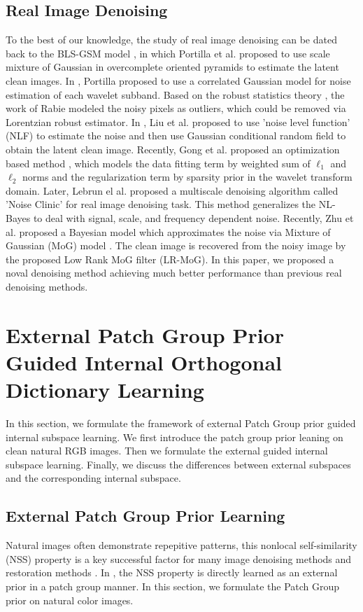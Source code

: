\documentclass[10pt,twocolumn,letterpaper]{article}
\begin{document}
\subsection{Real Image Denoising}
To the best of our knowledge, the study of real image denoising can be dated back to the BLS-GSM model \cite{blsgsm}, in which Portilla et al. proposed to use scale mixture of Gaussian in overcomplete oriented pyramids to estimate the latent clean images. In \cite{fullyblind}, Portilla proposed to use a correlated Gaussian model for noise estimation of each wavelet subband. Based on the robust statistics theory \cite{huber2011robust}, the work of Rabie \cite{rabie2005robust} modeled the noisy pixels as outliers, which could be removed via Lorentzian robust estimator. In \cite{Liu2008}, Liu et al. proposed to use 'noise level function' (NLF) to estimate the noise and then use Gaussian conditional random field to obtain the latent clean image. Recently, Gong et al. proposed an optimization based method \cite{almapg}, which models the data fitting term by weighted sum of $\ell_{1}$ and $\ell_{2}$ norms and the regularization term by sparsity prior in the wavelet transform domain. Later, Lebrun el al. proposed a multiscale denoising algorithm called 'Noise Clinic' \cite{noiseclinic} for real image denoising task. This method generalizes the NL-Bayes \cite{nlbayes} to deal with signal, scale, and frequency dependent noise. Recently, Zhu et al. proposed a Bayesian model \cite{Zhu_2016_CVPR} which approximates the noise via Mixture of Gaussian (MoG) model \cite{Bishop}. The clean image is recovered from the noisy image by the proposed Low Rank MoG filter (LR-MoG). In this paper, we proposed a noval denoising method achieving much better performance than previous real denoising methods.

\section{External Patch Group Prior Guided Internal Orthogonal Dictionary Learning}
In this section, we formulate the framework of external Patch Group prior guided internal subspace learning. We first introduce the patch group prior leaning on clean natural RGB images. Then we formulate the external guided internal subspace learning. Finally, we discuss the differences between external subspaces and the corresponding internal subspace.

\subsection{External Patch Group Prior Learning}
Natural images often demonstrate repepitive patterns, this nonlocal self-similarity (NSS) property is a key successful factor for many image denoising methods \cite{nlm,bm3d,lssc,ncsr,wnnm,pgpd} and restoration methods \cite{}. In \cite{pgpd}, the NSS property is directly learned as an external prior in a patch group manner. In this section, we formulate the Patch Group prior on natural color images.
\end{document}
